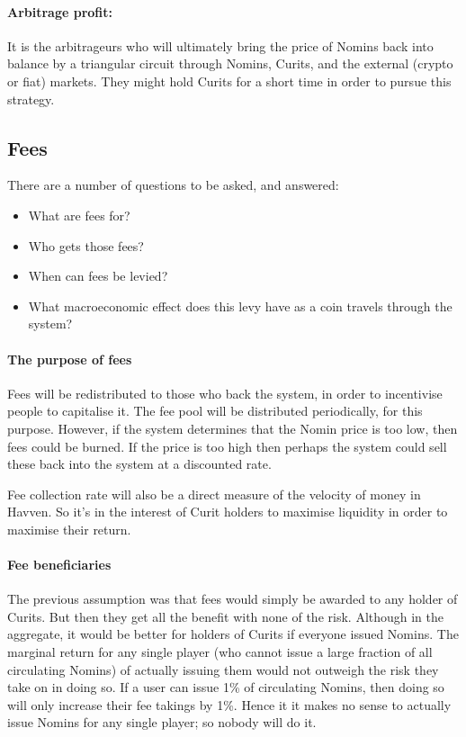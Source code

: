 \documentclass{article}
\begin{document}
\paragraph{Arbitrage profit:}
It is the arbitrageurs who will ultimately bring the price of Nomins back into balance by a triangular circuit through Nomins, Curits, and the external (crypto or fiat) markets. They might hold Curits for a short time in order to pursue this strategy.


\pagebreak
\subsection{Fees}
There are a number of questions to be asked, and answered:
\begin{itemize}
    \item What are fees for?
    \item Who gets those fees?
    \item When can fees be levied?
    \item What macroeconomic effect does this levy have as a coin travels through the system?
\end{itemize}

\paragraph{The purpose of fees}

Fees will be redistributed to those who back the system, in order to incentivise people to capitalise it. The fee pool will be distributed periodically, for this purpose. However, if the system determines that the Nomin price is too low, then fees could be burned. If the price is too high then perhaps the system could sell these back into the system at a discounted rate.

Fee collection rate will also be a direct measure of the velocity of money in Havven. So it's in the interest of Curit holders to maximise liquidity in order to maximise their return.

\paragraph{Fee beneficiaries}

The previous assumption was that fees would simply be awarded to any holder of Curits. But then they get all the benefit with none of the risk. Although in the aggregate, it would be better for holders of Curits if everyone issued Nomins. The marginal return for any single player (who cannot issue a large fraction of all circulating Nomins) of actually issuing them would not outweigh the risk they take on in doing so. If a user can issue 1\% of circulating Nomins, then doing so will only increase their fee takings by 1\%.
Hence it it makes no sense to actually issue Nomins for any single player; so nobody will do it.
\end{document}
